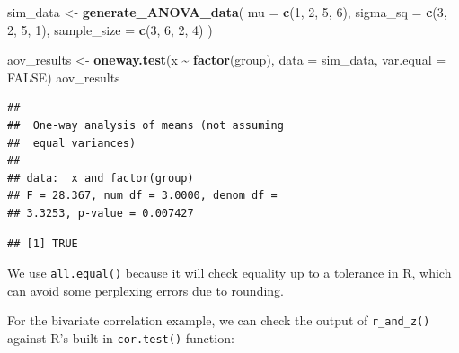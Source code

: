 \documentclass[
]{book}
\newenvironment{Shaded}{\begin{snugshade}}{\end{snugshade}}
\newcommand{\AttributeTok}[1]{\textcolor[rgb]{0.13,0.29,0.53}{#1}}
\newcommand{\ConstantTok}[1]{\textcolor[rgb]{0.56,0.35,0.01}{#1}}
\newcommand{\DecValTok}[1]{\textcolor[rgb]{0.00,0.00,0.81}{#1}}
\newcommand{\FunctionTok}[1]{\textcolor[rgb]{0.13,0.29,0.53}{\textbf{#1}}}
\newcommand{\NormalTok}[1]{#1}
\newcommand{\OtherTok}[1]{\textcolor[rgb]{0.56,0.35,0.01}{#1}}
\newcommand{\SpecialCharTok}[1]{\textcolor[rgb]{0.81,0.36,0.00}{\textbf{#1}}}
\begin{document}
\begin{Shaded}
\begin{Highlighting}[]
\NormalTok{sim\_data }\OtherTok{\textless{}{-}} \FunctionTok{generate\_ANOVA\_data}\NormalTok{(}
  \AttributeTok{mu =} \FunctionTok{c}\NormalTok{(}\DecValTok{1}\NormalTok{, }\DecValTok{2}\NormalTok{, }\DecValTok{5}\NormalTok{, }\DecValTok{6}\NormalTok{), }
  \AttributeTok{sigma\_sq =} \FunctionTok{c}\NormalTok{(}\DecValTok{3}\NormalTok{, }\DecValTok{2}\NormalTok{, }\DecValTok{5}\NormalTok{, }\DecValTok{1}\NormalTok{),}
  \AttributeTok{sample\_size =} \FunctionTok{c}\NormalTok{(}\DecValTok{3}\NormalTok{, }\DecValTok{6}\NormalTok{, }\DecValTok{2}\NormalTok{, }\DecValTok{4}\NormalTok{)}
\NormalTok{)}

\NormalTok{aov\_results }\OtherTok{\textless{}{-}} \FunctionTok{oneway.test}\NormalTok{(x }\SpecialCharTok{\textasciitilde{}} \FunctionTok{factor}\NormalTok{(group), }\AttributeTok{data =}\NormalTok{ sim\_data, }
                           \AttributeTok{var.equal =} \ConstantTok{FALSE}\NormalTok{)}
\NormalTok{aov\_results}
\end{Highlighting}
\end{Shaded}

\begin{verbatim}
## 
##  One-way analysis of means (not assuming
##  equal variances)
## 
## data:  x and factor(group)
## F = 28.367, num df = 3.0000, denom df =
## 3.3253, p-value = 0.007427
\end{verbatim}

\begin{Shaded}
\end{Shaded}

\begin{verbatim}
## [1] TRUE
\end{verbatim}

We use \texttt{all.equal()} because it will check equality up to a tolerance in R, which can avoid some perplexing errors due to rounding.

For the bivariate correlation example, we can check the output of \texttt{r\_and\_z()} against R's built-in \texttt{cor.test()} function:
\end{document}
